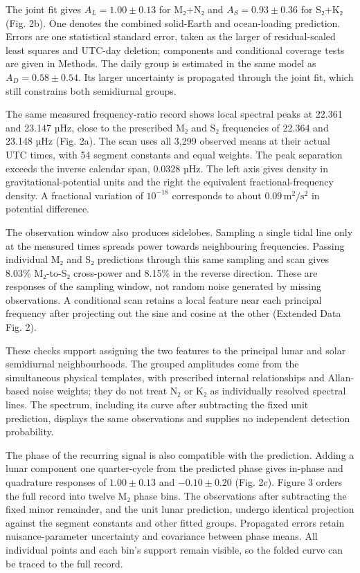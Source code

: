 \documentclass[
  10pt,
  a4paper,
]{article}
\begin{document}
The joint fit gives \(A_L=1.00\pm0.13\) for M₂+N₂ and
\(A_S=0.93\pm0.36\) for S₂+K₂ (Fig. 2b). One denotes the combined
solid-Earth and ocean-loading prediction. Errors are one statistical
standard error, taken as the larger of residual-scaled least squares and
UTC-day deletion; components and conditional coverage tests are given in
Methods. The daily group is estimated in the same model as
\(A_D=0.58\pm0.54\). Its larger uncertainty is propagated through the
joint fit, which still constrains both semidiurnal groups.

The same measured frequency-ratio record shows local spectral peaks at
22.361 and 23.147 µHz, close to the prescribed M₂ and S₂ frequencies of
22.364 and 23.148 µHz (Fig. 2a). The scan uses all 3,299 observed means
at their actual UTC times, with 54 segment constants and equal weights.
The peak separation exceeds the inverse calendar span, 0.0328 µHz. The
left axis gives density in gravitational-potential units and the right
the equivalent fractional-frequency density. A fractional variation of
\(10^{-18}\) corresponds to about \(0.09\,\mathrm{m^2/s^2}\) in
potential difference.

The observation window also produces sidelobes. Sampling a single tidal
line only at the measured times spreads power towards neighbouring
frequencies. Passing individual M₂ and S₂ predictions through this same
sampling and scan gives 8.03\% M₂-to-S₂ cross-power and 8.15\% in the
reverse direction. These are responses of the sampling window, not
random noise generated by missing observations. A conditional scan
retains a local feature near each principal frequency after projecting
out the sine and cosine at the other (Extended Data Fig. 2).

These checks support assigning the two features to the principal lunar
and solar semidiurnal neighbourhoods. The grouped amplitudes come from
the simultaneous physical templates, with prescribed internal
relationships and Allan-based noise weights; they do not treat N₂ or K₂
as individually resolved spectral lines. The spectrum, including its
curve after subtracting the fixed unit prediction, displays the same
observations and supplies no independent detection probability.

The phase of the recurring signal is also compatible with the
prediction. Adding a lunar component one quarter-cycle from the
predicted phase gives in-phase and quadrature responses of
\(1.00\pm0.13\) and \(-0.10\pm0.20\) (Fig. 2c). Figure 3 orders the full
record into twelve M₂ phase bins. The observations after subtracting the
fixed minor remainder, and the unit lunar prediction, undergo identical
projection against the segment constants and other fitted groups.
Propagated errors retain nuisance-parameter uncertainty and covariance
between phase means. All individual points and each bin's support remain
visible, so the folded curve can be traced to the full record.
\end{document}
